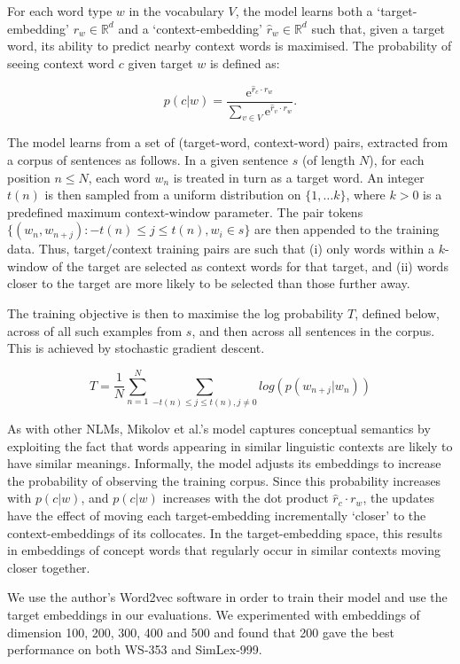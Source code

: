 \documentclass[fullname]{clv2}
\newcommand{\me}{\mathrm{e}}
\begin{document}
For each word type \(w\) in the vocabulary \(V\), the model learns both a `target-embedding' \( r_{w} \in \mathbb{R}^d\) and a `context-embedding' \(\hat{r}_{w} \in \mathbb{R}^d\) such that, given a target word, its ability to predict nearby context words is maximised. The probability of seeing context word \(c\) given target \(w\) is defined as:  

\[p(c|w)  = \frac{\me^{\hat{r}_{c} \cdot r_{w}}}{\sum_{v \in V} \me^{\hat{r}_v\cdot r_{w}}}.\]

The model learns from a set of (target-word, context-word) pairs, extracted from a corpus of sentences as follows. In a given sentence \(s\) (of length \(N\)), for each position \( n \leq N\), each word \(w_n\) is treated in turn as a target word. An integer \( {t(n)} \) is then sampled from a uniform distribution on \( \{1, \dots k \} \), where \(k > 0\) is a predefined maximum context-window parameter. The pair tokens \( \{(w_n, w_{n+j}): -{t(n)}\leq j \leq {t(n)}, w_i \in s \}\) are then appended to the training data. Thus, target/context training pairs are such that (i) only words within a \(k\)-window of the target are selected as context words for that target, and (ii) words closer to the target are more likely to be selected than those further away.

The training objective is then to maximise the log probability \( T\), defined below, across of all such examples from \(s\), and then across all sentences in the corpus. This is achieved by stochastic gradient descent. 

\[ T = \frac{1}{N} \sum_{n=1}^{N} \sum_{-{t(n)}\leq j \leq {t(n)}, j\neq 0} log(  p(w_{n+j}|w_{n}) ) \]

As with other NLMs, Mikolov et al.'s model captures conceptual semantics by exploiting the fact that words appearing in similar linguistic contexts are likely to have similar meanings. Informally, the model adjusts its embeddings to increase the probability of observing the training corpus. Since this probability increases with \(p(c|w)\), and \(p(c|w)\) increases with the dot product \( \hat{r}_c\cdot r_{w} \), the updates have the effect of moving each target-embedding incrementally `closer' to the context-embeddings of its collocates. In the target-embedding space, this results in embeddings of concept words that regularly occur in similar contexts moving closer together.  

We use the author's Word2vec software in order to train their model and use the target embeddings in our evaluations. We experimented with embeddings of dimension 100, 200, 300, 400 and 500 and found that 200 gave the best performance on both WS-353 and SimLex-999. 
\end{document}
